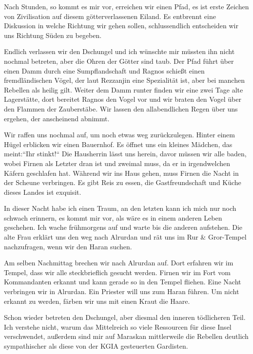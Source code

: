 Nach Stunden, so kommt es mir vor, erreichen wir einen Pfad, es ist erste Zeichen von Zivilisation auf diesem götterverlassenen Eiland. Es entbrennt eine Diskussion in welche Richtung wir gehen sollen, schlussendlich entscheiden wir uns Richtung Süden zu begeben. 

Endlich verlassen wir den Dschungel und ich wünschte mir müssten ihn nicht nochmal betreten, aber die Ohren der Götter sind taub. Der Pfad führt über einen Damm durch eine Sumpflandschaft und Ragnos schießt einen fremdländischen Vögel, der laut Rezzanjin eine Spezialität ist, aber bei manchen Rebellen als heilig gilt. Weiter dem Damm runter finden wir eine zwei Tage alte Lagerstätte, dort bereitet Ragnos den Vogel vor und wir braten den Vogel über den Flammen der Zauberstäbe. Wir lassen den allabendlichen Regen über uns ergehen, der anscheinend abnimmt. 

Wir raffen uns nochmal auf, um noch etwas weg zurückzulegen. Hinter einem Hügel erblicken wir einen Bauernhof. Es öffnet uns ein kleines Mädchen, das meint:``Ihr stinkt!`` Die Hausherrin lässt uns herein, davor müssen wir alle baden, wobei Firnen als Letzter dran ist und zweimal muss, da er in irgendwelchen Käfern geschlafen hat. Während wir ins Haus gehen, muss Firnen die Nacht in der Scheune verbringen. Es gibt Reis zu essen, die Gastfreundschaft und Küche dieses Landes ist exquisit. 

In dieser Nacht habe ich einen Traum, an den letzten kann ich mich nur noch schwach erinnern, es kommt mir vor, als wäre es in einem anderen Leben geschehen. Ich wache frühmorgens auf und warte bis die anderen aufstehen. Die alte Frau erklärt uns den weg nach Alrurdan und rät uns im Rur \& Gror-Tempel nachzufragen, wenn wir den Haran suchen.

Am selben Nachmittag brechen wir nach Alrurdan auf. Dort erfahren wir im Tempel, dass wir alle steckbrieflich gesucht werden. Firnen wir im Fort vom Kommandanten erkannt und kann gerade so in den Tempel fliehen. Eine Nacht verbringen wir in Alrurdan. Ein Priester will uns zum Haran führen. Um nicht erkannt zu werden, färben wir uns mit einen Kraut die Haare.

Schon wieder betreten den Dschungel, aber diesmal den inneren tödlicheren Teil. Ich verstehe nicht, warum das Mittelreich so viele Ressourcen für diese Insel verschwendet, außerdem sind mir auf Maraskan mittlerweile die Rebellen deutlich sympathischer als diese von der KGIA gesteuerten Gardisten.

